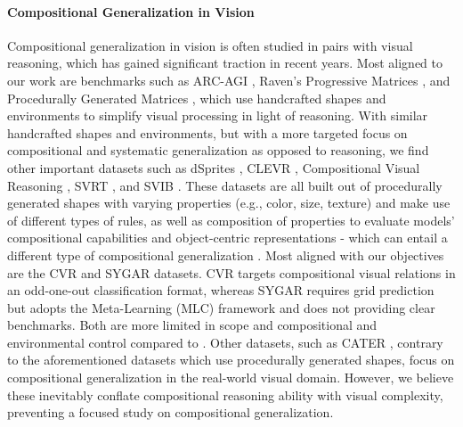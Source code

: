 \paragraph{Compositional Generalization in Vision} Compositional generalization in vision is often studied in pairs with visual reasoning, which has gained significant traction in recent years. Most aligned to our work are benchmarks such as ARC-AGI \citep{cholletARC}, Raven’s Progressive Matrices \citep{raven2003raven}, and Procedurally Generated Matrices \citep{barrett2018measuring}, which use handcrafted shapes and environments to simplify visual processing in light of reasoning. With similar handcrafted shapes and environments, but with a more targeted focus on compositional and systematic generalization as opposed to reasoning, we find other important datasets such as dSprites \cite{multiDsprites}, CLEVR \cite{clevr}, Compositional Visual Reasoning \cite{cvr2022}, SVRT \citep{fleuret2011comparing}, and SVIB \citep{svib2023}. These datasets are all built out of procedurally generated shapes with varying properties (e.g., color, size, texture) and make use of different types of rules, as well as composition of properties to evaluate models' compositional capabilities and object-centric representations - which can entail a different type of compositional generalization \cite{wiedemer2023compositional, wiedemer2023provable, brady2023provably}. Most aligned with our objectives are the CVR \cite{cvr2022} and SYGAR \cite{mondorf2025enabling} datasets. CVR targets compositional visual relations in an odd-one-out classification format, whereas SYGAR requires grid prediction but adopts the Meta-Learning (MLC) framework \cite{lake_baroni_2023} and does not providing clear benchmarks. Both are more limited in scope and compositional and environmental control compared to \generatorName. Other datasets, such as CATER \cite{girdhar2019cater}, contrary to the aforementioned datasets which use procedurally generated shapes, focus on compositional generalization in the real-world visual domain. However, we believe these inevitably conflate compositional reasoning ability with visual complexity, preventing a focused study on compositional generalization.

 

